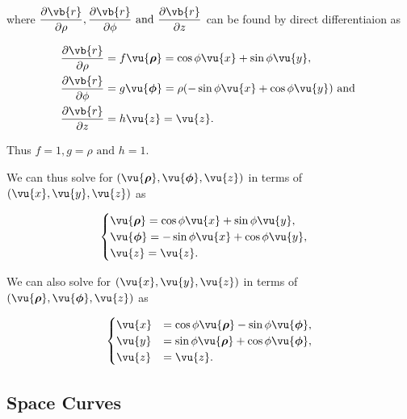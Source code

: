 \documentclass[english,a4paper,12pt]{report}
\begin{document}
where \(\displaystyle \frac{\partial \vb{r} }{\partial \rho }, \frac{\partial \vb{r} }{\partial \phi } \text { and } \frac{\partial \vb{r} }{\partial z} \) can be found by direct differentiaion as 

\begin{equation}
	\begin{aligned} 
		\frac{\partial \vb{r} }{\partial \rho }  &= f \vu{\boldsymbol{\rho } } = \cos{\phi}\vu{x} + \sin{\phi}\vu{y}, \\
		\frac{\partial \vb{r} }{\partial \phi }  &= g \vu{\boldsymbol{\phi } } = \rho (-\sin{\phi}\vu{x} + \cos{\phi}\vu{y}) \text { and }  \\
		\frac{\partial \vb{r} }{\partial z }  &= h \vu{z} = \vu{z}. 
	\end{aligned} 
\end{equation}

Thus \(f = 1, g = \rho  \text { and }  h = 1\). 

We can thus solve for \((\vu{\boldsymbol{\rho } }, \vu{\boldsymbol{\phi } }, \vu{z} )\) in terms of \((\vu{x} ,\vu{y} ,\vu{z} )\) as

\begin{equation}
    \begin{cases} 
        \vu{\boldsymbol{\rho } } = \cos \phi \vu{x} + \sin \phi \vu{y}, \\
        \vu{\boldsymbol{\phi } } = -\sin \phi \vu{x} + \cos \phi \vu{y}, \\
        \vu{z} = \vu{z}.
        \end{cases}
\end{equation}



We can also solve for \((\vu{x} , \vu{y}, \vu{z} )\) in terms of \((\vu{\boldsymbol{\rho } }, \vu{\boldsymbol{\phi } }, \vu{z} )\) as  

\begin{equation}
    \begin{cases}
        \vu{x} &= \cos \phi  \vu{\boldsymbol{\rho } } - \sin \phi \vu{\boldsymbol{\phi } }, \\
        \vu{y} &= \sin \phi \vu{\boldsymbol{\rho } } + \cos \phi \vu{\boldsymbol{\phi } }, \\
        \vu{z} &= \vu{z}. 
        \end{cases}
\end{equation}

\subsection{Space Curves}
\end{document}
